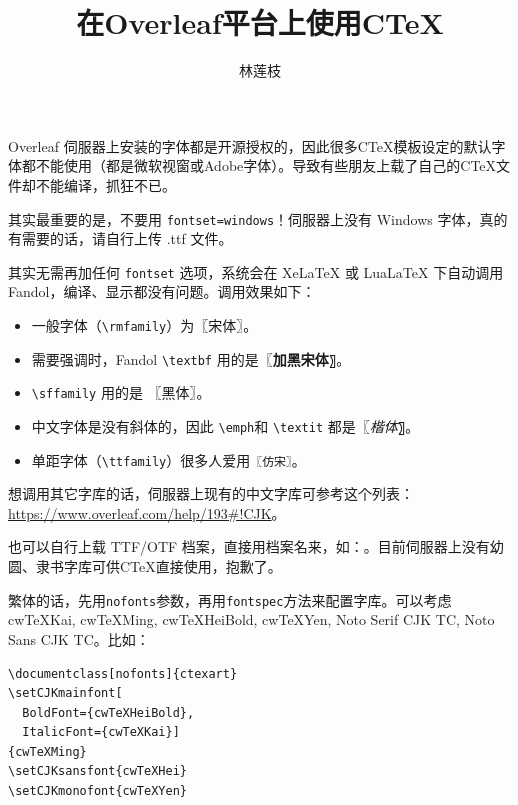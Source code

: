 \documentclass[11pt]{ctexart}
\title{在Overleaf平台上使用C\TeX}
\author{林莲枝}
\begin{document}
\maketitle

Overleaf 伺服器上安装的字体都是开源授权的，因此很多C\TeX{}模板设定的默认字体都不能使用（都是微软视窗或Adobe字体）。导致有些朋友上载了自己的C\TeX{}文件却不能编译，抓狂不已。

其实最重要的是，不要用 \verb|fontset=windows|！伺服器上没有 Windows 字体，真的有需要的话，请自行上传 .ttf 文件。

其实无需再加任何 \verb|fontset| 选项，系统会在 XeLaTeX 或 LuaLaTeX 下自动调用 Fandol，编译、显示都没有问题。调用效果如下：

\begin{itemize}
\item 一般字体（\verb|\rmfamily|）为〖宋体〗。
\item 需要强调时，Fandol \verb|\textbf| 用的是〖\textbf{加黑宋体}〗。
\item \verb|\sffamily| 用的是 〖\textsf{黑体}〗。
\item 中文字体是没有斜体的，因此 \verb|\emph|和 \verb|\textit| 都是〖\textit{楷体}〗。

\item 单距字体（\verb|\ttfamily|）很多人爱用\texttt{〖仿宋〗}。

\end{itemize}


想调用其它字库的话，伺服器上现有的中文字库可参考这个列表：\url{https://www.overleaf.com/help/193#!CJK}。

也可以自行上载 TTF/OTF 档案，直接用档案名来，如：\texttt{\setmainfont{shuti.otf}}。目前伺服器上没有幼圆、隶书字库可供C\TeX{}直接使用，抱歉了。


繁体的话，先用\verb|nofonts|参数，再用\verb|fontspec|方法来配置字库。可以考虑 cwTeXKai, cwTeXMing, cwTeXHeiBold, cwTeXYen, Noto Serif CJK TC, Noto Sans CJK TC。比如：

\begin{verbatim}
\documentclass[nofonts]{ctexart}
\setCJKmainfont[
  BoldFont={cwTeXHeiBold},
  ItalicFont={cwTeXKai}]
{cwTeXMing}
\setCJKsansfont{cwTeXHei}
\setCJKmonofont{cwTeXYen}
\end{verbatim}
\end{document}
